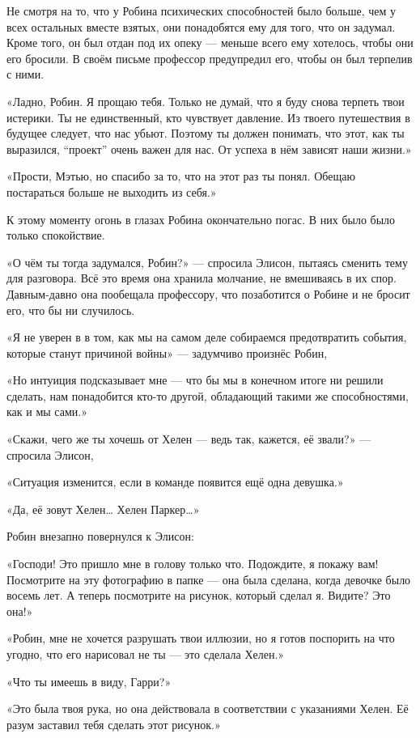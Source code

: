 \documentclass[a5paper, 9pt,
final, openany, twoside=true]{memoir}
\begin{document}
Не смотря на то, что у Робина психических способностей было больше, чем у всех остальных вместе взятых, они понадобятся ему для того, что он задумал. Кроме того, он был отдан под их опеку — меньше всего ему хотелось, чтобы они его бросили. В своём письме профессор предупредил его, чтобы он был терпелив с ними.

«Ладно, Робин. Я прощаю тебя. Только не думай, что я буду снова терпеть твои истерики. Ты не единственный, кто чувствует давление. Из твоего путешествия в будущее следует, что нас убьют. Поэтому ты должен понимать, что этот, как ты выразился, ``проект'' очень важен для нас. От успеха в нём зависят наши жизни.»

«Прости, Мэтью, но спасибо за то, что на этот раз ты понял. Обещаю постараться больше не выходить из себя.»

К этому моменту огонь в глазах Робина окончательно погас. В них было было только спокойствие.

«О чём ты тогда задумался, Робин?» — спросила Элисон, пытаясь сменить тему для разговора. Всё это время она хранила молчание, не вмешиваясь в их спор. Давным-давно она пообещала профессору, что позаботится о Робине и не бросит его, что бы ни случилось.

«Я не уверен в в том, как мы на самом деле собираемся предотвратить события, которые станут причиной войны» — задумчиво произнёс Робин,

«Но интуиция подсказывает мне — что бы мы в конечном итоге ни решили сделать, нам понадобится кто-то другой, обладающий такими же способностями, как и мы сами.»

«Скажи, чего же ты хочешь от Хелен — ведь так, кажется, её звали?» — спросила Элисон,

«Ситуация изменится, если в команде появится ещё одна девушка.»

«Да, её зовут Хелен…  Хелен Паркер…»

Робин внезапно повернулся к Элисон:

«Господи! Это пришло мне в голову только что. Подождите, я покажу вам! Посмотрите на эту фотографию в папке — она была сделана, когда девочке было восемь лет. А теперь посмотрите на рисунок, который сделал я. Видите? Это она!»

«Робин, мне не хочется разрушать твои иллюзии, но я готов поспорить на что угодно, что его нарисовал не ты — это сделала Хелен.»

«Что ты имеешь в виду, Гарри?»

«Это была твоя рука, но она действовала в соответствии с указаниями Хелен. Её разум заставил тебя сделать этот рисунок.»
\end{document}
